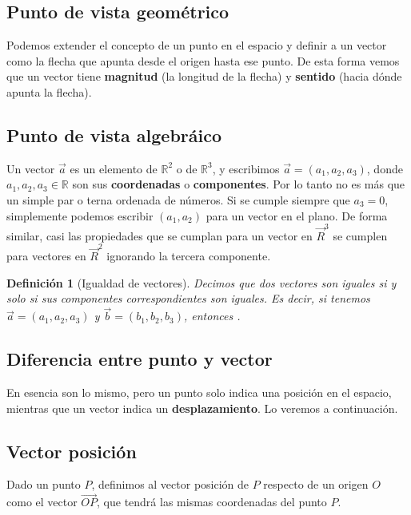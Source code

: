 \documentclass[12pt, fleqn]{report}                             %
\newtheorem{Definition}{Definición}[section]                    %
\newcommand{\ve}[1]{\vec{#1}}									%
\newcommand{\Ve}[1]{\overrightarrow{#1}}
\begin{document}
			\subsection{Punto de vista geométrico}
			
			Podemos extender el concepto de un punto en el espacio y definir a un vector como la flecha que apunta desde el origen hasta ese punto. De esta forma vemos que un vector tiene \textbf{magnitud} (la longitud de la flecha) y \textbf{sentido} (hacia dónde apunta la flecha).
			
			\subsection{Punto de vista algebráico}
			
			Un vector \(\vec{a}\) es un elemento de \(\mathbb{R}^2\) o de \(\mathbb{R}^3\), y escribimos \(\vec{a}=(a_1, a_2, a_3)\), donde $a_1, a_2, a_3 \in \mathbb{R}$ son sus \textbf{coordenadas} o \textbf{componentes}. Por lo tanto no es más que un simple par o terna ordenada de números. Si se cumple siempre que $a_3=0$, simplemente podemos escribir $(a_1, a_2)$ para un vector en el plano. De forma similar, casi las propiedades que se cumplan para un vector en $\ve{R}^3$ se cumplen para vectores en $\ve{R}^2$ ignorando la tercera componente.
			
			\begin{Definition}[Igualdad de vectores]
				Decimos que dos vectores son iguales si y solo si sus componentes correspondientes son iguales. Es decir, si tenemos $\ve{a}=(a_1, a_2, a_3)$ y $\ve{b}=(b_1, b_2, b_3)$, entonces \boxed{\mbox{$\ve{a}=\ve{b}$ si y solo si $a_1=b_1$, $a_2=b_2$ y $a_3=b_3$}}.
			\end{Definition}
		
			\subsection{Diferencia entre punto y vector}
			
			En esencia son lo mismo, pero un punto solo indica una posición en el espacio, mientras que un vector indica un \textbf{desplazamiento}. Lo veremos a continuación.
			
			\subsection{Vector posición}
			
			Dado un punto $P$, definimos al vector posición de $P$ respecto de un origen $O$ como el vector $\Ve{OP}$, que tendrá las mismas coordenadas del punto $P$.
			
\end{document}
